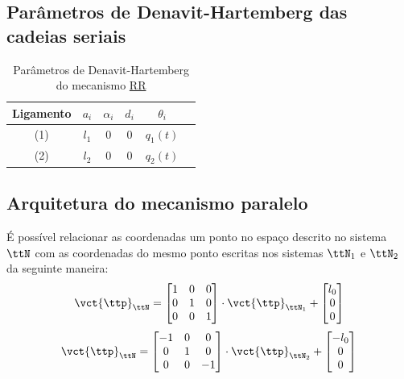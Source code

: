 \documentclass[]{politex}
\begin{document}
\subsection{Parâmetros de Denavit-Hartemberg das cadeias seriais}

\begin{table}[H]
\begin{center}
\caption{Parâmetros de Denavit-Hartemberg do mecanismo \underline{R}\underline{R}}
\begin{tabular}{|c|c|c|c|c|c|} 
	\hline
	\rule[-2mm]{0mm}{6mm}
	Ligamento & $a_i$ & $\alpha_i$ & $d_i$ & $\theta_i$ \\
	\hline
	\rule[-2mm]{0mm}{6mm}
	(1) & $l_1$ & $0$ & $0$ & $q_1(t)$  \\
	\rule[-1mm]{0mm}{5mm}
	(2) & $l_2$ & $0$ & $0$ & $q_2(t)$  \\
	\hline
\end{tabular}
\label{tab:DH}
\end{center}
\end{table}

\subsection{Arquitetura do mecanismo paralelo}

É possível relacionar as coordenadas um ponto no espaço descrito no sistema $\ttN$ com as coordenadas do mesmo ponto escritas nos sistemas $\ttN_1$ e $\ttN_2$ da seguinte maneira:
\begin{equation}
\vct{\ttp}_{\ttN} = \begin{bmatrix}
1 & 0 & 0 \\
0 & 1 & 0 \\
0 & 0 & 1 \\
\end{bmatrix}
\cdot
\vct{\ttp}_{\ttN_1}
+
\begin{bmatrix}
l_0 \\
0 \\
0 
\end{bmatrix}
\end{equation}
\begin{equation}
\vct{\ttp}_{\ttN} = \begin{bmatrix}
-1 & 0 & 0 \\
0 & 1 & 0 \\
0 & 0 & -1 \\
\end{bmatrix}
\cdot
\vct{\ttp}_{\ttN_2}
+
\begin{bmatrix}
-l_0 \\
0 \\
0 
\end{bmatrix}
\end{equation}
\end{document}
